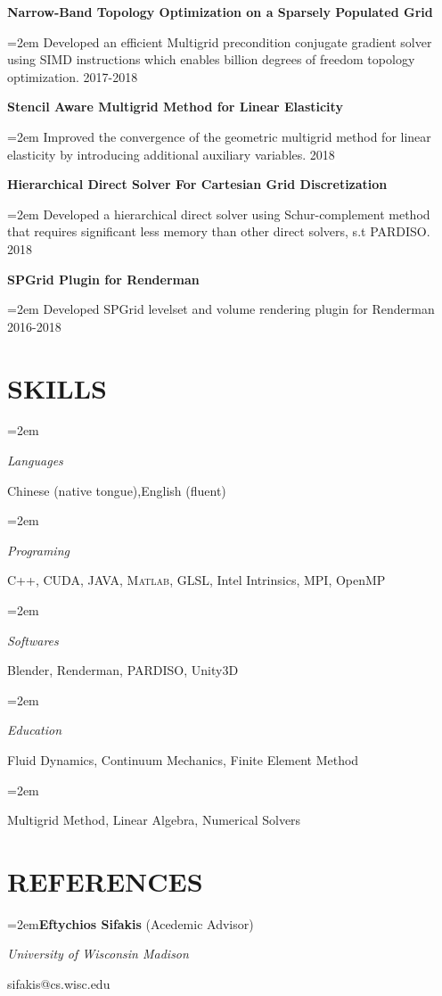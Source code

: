 \documentclass[paper=a4,fontsize=10pt]{scrartcl} %
\newlength{\spacebox}
\newcommand{\NewPart}[1]{\section*{\uppercase{#1}}\vspace*{-0.3em}}
\newcommand{\PersonalEntry}[2]{
		\noindent\hangindent=2em\hangafter=0 %
		\parbox{\spacebox}{        %
		\textit{#1}}		       %
		\hspace{1.5em} #2 \par}    %
\newcommand{\SkillsEntry}[2]{      %
		\noindent\hangindent=2em\hangafter=0 %
		\parbox{\spacebox}{        %
		\textit{#1}}			   %
		\hspace{1.5em} #2 \par}    %
\newcommand{\ReferenceEntry}[4]{				  %
		\noindent\hangindent=2em\hangafter=0\textbf{#1} #2 \par  %
		\hspace{2.5em} \textit{#3} \par              %
		\hspace{2.5em} \small #4 %
		\normalsize \par}
\newcommand{\EducationEntry}[4]{
		\noindent \textbf{#1} \hfill      %
		\colorbox{White}{%
			\parbox{6em}{%
			\hfill\color{Black}#2}} \par  %
		\noindent \textit{#3} \par        %
		\noindent\hangindent=2em\hangafter=0 \small #4 %
		\normalsize \par}
\newcommand{\ResearchEntry}[3]{				  %
		\noindent \textbf{#1} \hfill    \par%
		\noindent\hangindent=2em\hangafter=0 \small #3 %
		\hfill \colorbox{White}{\color{Black}#2}   %
		\normalsize \par}
\newcommand{\Publication}[3]{	\indent	  
		\noindent #1\small       %
		\noindent \textit{#2} %
		\noindent #3\small \par              %
		\normalsize \par}
\begin{document}
\ResearchEntry{Narrow-Band Topology Optimization on a Sparsely Populated Grid}{2017-2018}{Developed an efficient Multigrid precondition conjugate gradient solver using SIMD instructions which enables billion degrees of freedom topology optimization.}
\ResearchEntry{Stencil Aware Multigrid Method for Linear Elasticity}{2018}{Improved the convergence of the geometric multigrid method for linear elasticity by introducing additional auxiliary variables.}
\ResearchEntry{Hierarchical Direct Solver For Cartesian Grid Discretization}{2018}{Developed a hierarchical direct solver using Schur-complement method that requires significant less memory than other direct solvers, s.t PARDISO.}
\ResearchEntry{SPGrid Plugin for Renderman\texttrademark}{2016-2018}{Developed SPGrid levelset and volume rendering plugin for Renderman\texttrademark}
\vspace*{-1em}
\NewPart{Skills}{}

\SkillsEntry{Languages}{Chinese (native tongue),English (fluent)}
\SkillsEntry{Programing}{\textsc{C++}, \textsc{CUDA},  \textsc{JAVA}, \textsc{Matlab}, GLSL, Intel Intrinsics, MPI, OpenMP}
\SkillsEntry{Softwares} {Blender, Renderman, PARDISO, Unity3D}
\SkillsEntry{Education}{Fluid Dynamics, Continuum Mechanics, Finite Element Method}
\SkillsEntry{}{Multigrid Method, Linear Algebra, Numerical Solvers}

\vspace*{-1em}
\NewPart{References}{}
\ReferenceEntry{Eftychios Sifakis}{(Acedemic Advisor)}
{University of Wisconsin Madison}
{sifakis@cs.wisc.edu}
\end{document}
